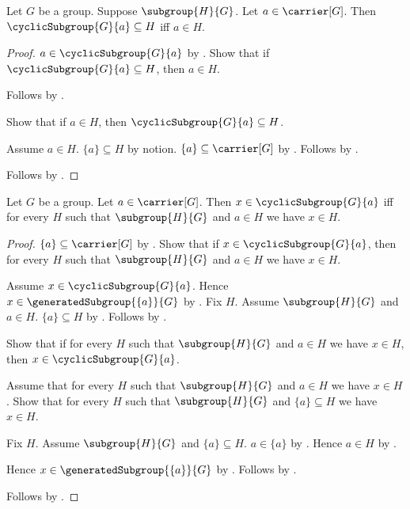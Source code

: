 \begin{theorem}\label{cyclic_subgroup_universal_property}
    Let $G$ be a group.
    Suppose $\subgroup{H}{G}$.
    Let $a\in\carrier[G]$.
    Then $\cyclicSubgroup{G}{a}\subseteq H$ iff $a\in H$.
\end{theorem}
\begin{proof}
    $a\in\cyclicSubgroup{G}{a}$ by
        .
    Show that if $\cyclicSubgroup{G}{a}\subseteq H$, then $a\in H$.
    \begin{subproof}
        Follows by .
    \end{subproof}
    Show that if $a\in H$, then $\cyclicSubgroup{G}{a}\subseteq H$.
    \begin{subproof}
        Assume $a\in H$.
        $\{a\}\subseteq H$ by notion.
        $\{a\}\subseteq\carrier[G]$ by
            .
        Follows by
            .
    \end{subproof}
    Follows by \auto.
\end{proof}

\begin{theorem}\label{cyclic_subgroup_iff}
    Let $G$ be a group.
    Let $a\in\carrier[G]$.
    Then $x\in\cyclicSubgroup{G}{a}$ iff for every $H$ such that
        $\subgroup{H}{G}$ and $a\in H$ we have $x\in H$.
\end{theorem}
\begin{proof}
    $\{a\}\subseteq\carrier[G]$ by
        .
    Show that if $x\in\cyclicSubgroup{G}{a}$, then for every $H$ such that
        $\subgroup{H}{G}$ and $a\in H$ we have $x\in H$.
    \begin{subproof}
        Assume $x\in\cyclicSubgroup{G}{a}$.
        Hence $x\in\generatedSubgroup{\{a\}}{G}$ by
            .
        Fix $H$.
        Assume $\subgroup{H}{G}$ and $a\in H$.
        $\{a\}\subseteq H$ by .
        Follows by .
    \end{subproof}
    Show that if for every $H$ such that
        $\subgroup{H}{G}$ and $a\in H$ we have $x\in H$, then
        $x\in\cyclicSubgroup{G}{a}$.
    \begin{subproof}
        Assume that for every $H$ such that
            $\subgroup{H}{G}$ and $a\in H$ we have $x\in H$.
        Show that for every $H$ such that
            $\subgroup{H}{G}$ and $\{a\}\subseteq H$ we have $x\in H$.
        \begin{subproof}
            Fix $H$.
            Assume $\subgroup{H}{G}$ and $\{a\}\subseteq H$.
            $a\in\{a\}$ by .
            Hence $a\in H$ by .
        \end{subproof}
        Hence $x\in\generatedSubgroup{\{a\}}{G}$ by
            .
        Follows by .
    \end{subproof}
    Follows by \auto.
\end{proof}

